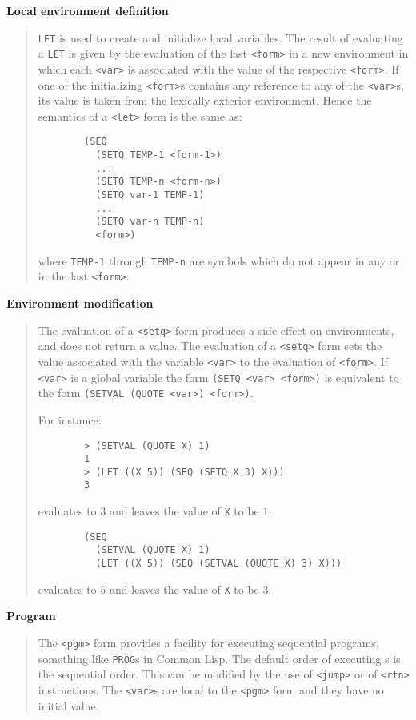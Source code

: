 {\bf Local environment definition}
\begin{quote}
	{\tt LET} is used to create and initialize local variables.
	The result of evaluating a {\tt LET} is given by the evaluation of the last
	{\tt <form>} in a new environment in which each {\tt <var>} is associated
	with the value of the respective {\tt <form>}.
	If one of the initializing {\tt <form>}s contains any reference to any of
	the {\tt <var>}s, its value is taken from the lexically exterior
	environment.
	Hence the semantics of a {\tt <let>} form is the same as:
	\begin{verbatim}
		(SEQ
		  (SETQ TEMP-1 <form-1>)
		  ...
		  (SETQ TEMP-n <form-n>)
		  (SETQ var-1 TEMP-1)
		  ...
		  (SETQ var-n TEMP-n)
		  <form>)
	\end{verbatim}
	where {\tt TEMP-1} through {\tt TEMP-n} are symbols which do not appear in
	any {\tt <form-i>} or in the last {\tt <form>}.
\end{quote}

{\bf Environment modification}
\begin{quote}
	The evaluation of a {\tt <setq>} form produces a side effect on
	environments, and does not return a value.
	The evaluation of a {\tt <setq>} form sets the value associated with the
	variable {\tt <var>} to the evaluation of {\tt <form>}.
	If {\tt <var>} is a global variable the form {\tt (SETQ <var> <form>)} is
	equivalent to the form {\tt (SETVAL (QUOTE <var>) <form>)}.

	For instance:
	\begin{verbatim}
		> (SETVAL (QUOTE X) 1)
		1
		> (LET ((X 5)) (SEQ (SETQ X 3) X)))
		3
	\end{verbatim}
	evaluates to $3$ and leaves the value of {\tt X} to be $1$.
	\begin{verbatim}
		(SEQ
		  (SETVAL (QUOTE X) 1)
		  (LET ((X 5)) (SEQ (SETVAL (QUOTE X) 3) X)))
	\end{verbatim}
	evaluates to $5$ and leaves the value of {\tt X} to be $3$.	
\end{quote}

{\bf Program}
\begin{quote}
	The {\tt <pgm>} form provides a facility for executing sequential programs,
	something like {\tt PROG}s in Common Lisp.
	The default order of executing {\tt <pgm-stm>}s is the sequential order.
	This can be modified by the use of {\tt <jump>} or of {\tt <rtn>}
	instructions.
	The {\tt <var>}s are local to the {\tt <pgm>} form and they have no initial
	value. 
\end{quote}

